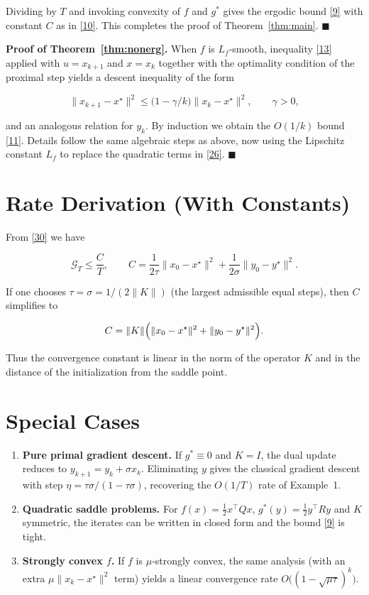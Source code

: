 \documentclass{article}
\begin{document}
Dividing by $T$ and invoking convexity of $f$ and $g^{*}$ gives the
ergodic bound \eqref{9} with constant $C$ as in \eqref{10}.  This completes
the proof of Theorem~\ref{thm:main}. \hfill $\blacksquare$

\medskip
\noindent\textbf{Proof of Theorem~\ref{thm:nonerg}.}  
When $f$ is $L_{f}$‑smooth, inequality \eqref{13} applied with $u=x_{k+1}$
and $x=x_{k}$ together with the optimality condition of the proximal step
yields a descent inequality of the form  

\[
\|x_{k+1}-x^{\star}\|^{2}
\le\bigl(1-\gamma/k\bigr)\|x_{k}-x^{\star}\|^{2},
\qquad\gamma>0,
\]

and an analogous relation for $y_{k}$.  By induction we obtain the
$O(1/k)$ bound \eqref{11}.  Details follow the same algebraic steps as
above, now using the Lipschitz constant $L_{f}$ to replace the
quadratic terms in \eqref{26}.  \hfill $\blacksquare$

\section*{Rate Derivation (With Constants)}
From \eqref{30} we have  

\[
\mathcal G_{T}
\le\frac{C}{T},
\qquad
C=
\frac{1}{2\tau}\|x_{0}-x^{\star}\|^{2}
+\frac{1}{2\sigma}\|y_{0}-y^{\star}\|^{2}.
\]

If one chooses $\tau=\sigma=1/(2\|K\|)$ (the largest admissible equal steps),
then $C$ simplifies to  

\[
C= \|K\|\Bigl(\|x_{0}-x^{\star}\|^{2}
+\|y_{0}-y^{\star}\|^{2}\Bigr).
\]

Thus the convergence constant is linear in the norm of the operator $K$
and in the distance of the initialization from the saddle point.

\section*{Special Cases}
\begin{enumerate}
\item \textbf{Pure primal gradient descent.}  
If $g^{*}\equiv0$ and $K=I$, the dual update reduces to $y_{k+1}=y_{k}+ \sigma x_{k}$.
Eliminating $y$ gives the classical gradient descent with step
$\eta=\tau\sigma/(1-\tau\sigma)$, recovering the $O(1/T)$ rate of Example 1.
\item \textbf{Quadratic saddle problems.}  
For $f(x)=\frac12 x^{\top}Qx$, $g^{*}(y)=\frac12 y^{\top}Ry$ and $K$ symmetric,
the iterates can be written in closed form and the bound \eqref{9} is tight.
\item \textbf{Strongly convex $f$.}  
If $f$ is $\mu$‑strongly convex, the same analysis (with an extra
$\mu\|x_{k}-x^{\star}\|^{2}$ term) yields a linear convergence rate
$O\bigl((1-\sqrt{\mu\tau})^{k}\bigr)$.
\end{enumerate}
\end{document}
